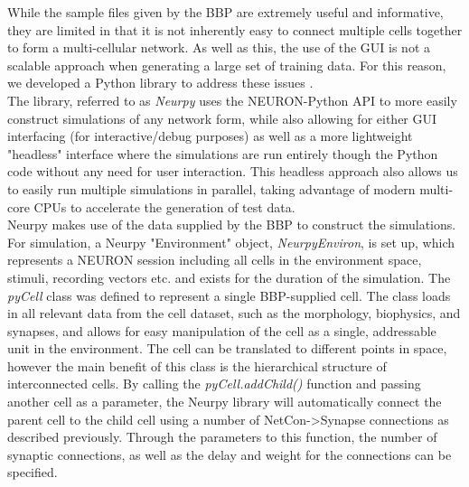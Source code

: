 While the sample files given by the BBP are extremely useful and informative, they are limited in that it is not inherently easy to connect multiple cells together to form a multi-cellular network. As well as this, the use of the GUI is not a scalable approach when generating a large set of training data. For this reason, we developed a Python library to address these issues \cite{neurpyGit}.\\
The library, referred to as \emph{Neurpy} uses the NEURON-Python API to more easily construct simulations of any network form, while also allowing for either GUI interfacing (for interactive/debug purposes) as well as a more lightweight "headless" interface where the simulations are run entirely though the Python code without any need for user interaction. This headless approach also allows us to easily run multiple simulations in parallel, taking advantage of modern multi-core CPUs to accelerate the generation of test data.\\
Neurpy makes use of the data supplied by the BBP to construct the simulations. For simulation, a Neurpy "Environment" object, \emph{NeurpyEnviron}, is set up, which represents a NEURON session including all cells in the environment space, stimuli, recording vectors etc. and exists for the duration of the simulation. The \emph{pyCell} class was defined to represent a single BBP-supplied cell. The class loads in all relevant data from the cell dataset, such as the morphology, biophysics, and synapses, and allows for easy manipulation of the cell as a single, addressable unit in the environment. The cell can be translated to different points in space, however the main benefit of this class is the hierarchical structure of interconnected cells. By calling the \emph{pyCell.addChild()} function and passing another cell as a parameter, the Neurpy library will automatically connect the parent cell to the child cell using a number of NetCon->Synapse connections as described previously. Through the parameters to this function, the number of synaptic connections, as well as the delay and weight for the connections can be specified.\\
